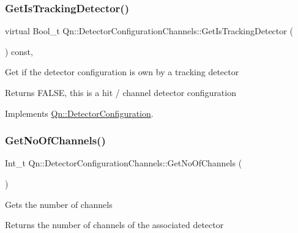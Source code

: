 \subsubsection{\texorpdfstring{Get\+Is\+Tracking\+Detector()}{GetIsTrackingDetector()}}
{\footnotesize\ttfamily virtual Bool\+\_\+t Qn\+::\+Detector\+Configuration\+Channels\+::\+Get\+Is\+Tracking\+Detector (\begin{DoxyParamCaption}{ }\end{DoxyParamCaption}) const\hspace{0.3cm}{\ttfamily [inline]}, {\ttfamily [virtual]}}

Get if the detector configuration is own by a tracking detector \begin{DoxyReturn}{Returns}
F\+A\+L\+SE, this is a hit / channel detector configuration 
\end{DoxyReturn}


Implements \mbox{\hyperlink{classQn_1_1DetectorConfiguration_acdb57db96ed24524b5a3a28821727a3d}{Qn\+::\+Detector\+Configuration}}.

\mbox{\label{classQn_1_1DetectorConfigurationChannels_a7d31f3204016bbb12099911649c29840}} 
\subsubsection{\texorpdfstring{Get\+No\+Of\+Channels()}{GetNoOfChannels()}}
{\footnotesize\ttfamily Int\+\_\+t Qn\+::\+Detector\+Configuration\+Channels\+::\+Get\+No\+Of\+Channels (\begin{DoxyParamCaption}{ }\end{DoxyParamCaption})\hspace{0.3cm}{\ttfamily [inline]}}

Gets the number of channels \begin{DoxyReturn}{Returns}
the number of channels of the associated detector 
\end{DoxyReturn}
\mbox{\label{classQn_1_1DetectorConfigurationChannels_a541ac77e7e2e15690eed089a66d0c5a1}} 
